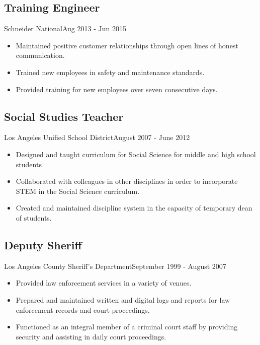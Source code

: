 \subsection{Training Engineer}{Schneider National}{Aug 2013 - Jun 2015}
\begin{itemize}
    \item Maintained positive customer relationships through open lines of honest communication. 
    \item Trained new employees in safety and maintenance standards.
    \item Provided training for new employees over seven consecutive days. 
\end{itemize}

\subsection{Social Studies Teacher}{Los Angeles Unified School District}{August 2007 - June 2012}
\begin{itemize}
    \item Designed and taught curriculum for Social Science for middle and high school students 
    \item Collaborated with colleagues in other disciplines in order to incorporate STEM in the Social Science curriculum.
    \item Created and maintained discipline system in the capacity of temporary dean of students.
\end{itemize}

\subsection{Deputy Sheriff}{Los Angeles County Sheriff’s Department}{September 1999 - August 2007}
\begin{itemize}
    \item Provided law enforcement services in a variety of venues.
    \item Prepared and maintained written and digital logs and reports for law enforcement records and court proceedings.
    \item Functioned as an integral member of a criminal court staff by providing security and assisting in daily court proceedings.
\end{itemize}
